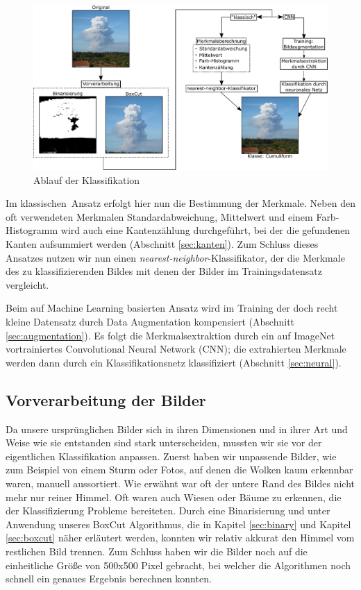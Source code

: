\documentclass[a4,german]{article}
\begin{document}
\begin{figure}
	\centering
	\includegraphics[height=0.25\paperheight]{Ablauf.pdf}
	\caption{Ablauf der Klassifikation}
	\label{fig:ablauf}
\end{figure}

Im \glqq klassischen\grqq\ Ansatz erfolgt hier nun die Bestimmung der Merkmale.
Neben den oft verwendeten Merkmalen Standardabweichung, Mittelwert und einem Farb-Histogramm wird auch eine Kantenzählung durchgeführt, bei der die gefundenen Kanten aufsummiert werden (Abschnitt \ref{sec:kanten}).
Zum Schluss dieses Ansatzes nutzen wir nun einen \emph{nearest-neighbor}-Klassifikator, der die Merkmale des zu klassifizierenden Bildes mit denen der Bilder im Trainingsdatensatz vergleicht.

Beim auf Machine Learning basierten Ansatz wird im Training der doch recht kleine Datensatz durch Data Augmentation kompensiert (Abschnitt \ref{sec:augmentation}).
Es folgt die Merkmalsextraktion durch ein auf ImageNet vortrainiertes Convolutional Neural Network (CNN); die extrahierten Merkmale werden dann durch ein Klassifikationsnetz klassifiziert (Abschnitt \ref{sec:neural}).



\subsection{Vorverarbeitung der Bilder}
\label{sec:vorverarbeitung}
Da unsere ursprünglichen Bilder sich in ihren Dimensionen und in ihrer Art und Weise wie sie entstanden sind stark unterscheiden, mussten wir sie vor der eigentlichen Klassifikation anpassen.
Zuerst haben wir unpassende Bilder, wie zum Beispiel von einem Sturm oder Fotos, auf denen die Wolken kaum erkennbar waren, manuell aussortiert.
Wie erwähnt war oft der untere Rand des Bildes nicht mehr nur reiner Himmel. Oft waren auch Wiesen oder Bäume zu erkennen, die der Klassifizierung Probleme bereiteten.
Durch eine Binarisierung und unter Anwendung unseres BoxCut Algorithmus, die in Kapitel \ref{sec:binary} und Kapitel \ref{sec:boxcut} näher erläutert werden, konnten wir relativ akkurat den Himmel vom restlichen Bild trennen.
Zum Schluss haben wir die Bilder noch auf die einheitliche Größe von 500x500 Pixel gebracht, bei welcher die Algorithmen noch schnell ein genaues Ergebnis berechnen konnten.
\end{document}
